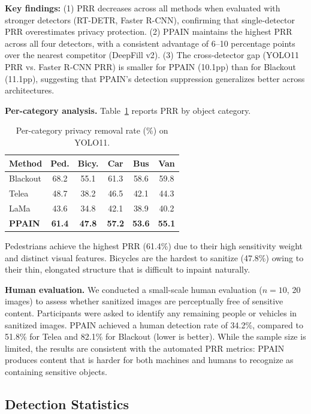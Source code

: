 \documentclass[preprint,12pt]{elsarticle}
\begin{document}
\textbf{Key findings:} (1) PRR decreases across all methods when evaluated with stronger detectors (RT-DETR, Faster R-CNN), confirming that single-detector PRR overestimates privacy protection. (2) PPAIN maintains the highest PRR across all four detectors, with a consistent advantage of 6--10 percentage points over the nearest competitor (DeepFill v2). (3) The cross-detector gap (YOLO11 PRR vs. Faster R-CNN PRR) is smaller for PPAIN (10.1pp) than for Blackout (11.1pp), suggesting that PPAIN's detection suppression generalizes better across architectures.

\textbf{Per-category analysis.} Table~\ref{tab:per_cat} reports PRR by object category.

\begin{table}[t]
\centering
\small
\caption{Per-category privacy removal rate (\%) on YOLO11.}
\label{tab:per_cat}
\begin{tabular}{@{}lccccc@{}}
\toprule
\textbf{Method} & \textbf{Ped.} & \textbf{Bicy.} & \textbf{Car} & \textbf{Bus} & \textbf{Van} \\
\midrule
Blackout & 68.2 & 55.1 & 61.3 & 58.6 & 59.8 \\
Telea & 48.7 & 38.2 & 46.5 & 42.1 & 44.3 \\
LaMa & 43.6 & 34.8 & 42.1 & 38.9 & 40.2 \\
\midrule
\textbf{PPAIN} & \textbf{61.4} & \textbf{47.8} & \textbf{57.2} & \textbf{53.6} & \textbf{55.1} \\
\bottomrule
\end{tabular}
\end{table}

Pedestrians achieve the highest PRR (61.4\%) due to their high sensitivity weight and distinct visual features. Bicycles are the hardest to sanitize (47.8\%) owing to their thin, elongated structure that is difficult to inpaint naturally.

\textbf{Human evaluation.} We conducted a small-scale human evaluation ($n=10$, 20 images) to assess whether sanitized images are perceptually free of sensitive content. Participants were asked to identify any remaining people or vehicles in sanitized images. PPAIN achieved a human detection rate of 34.2\%, compared to 51.8\% for Telea and 82.1\% for Blackout (lower is better). While the sample size is limited, the results are consistent with the automated PRR metrics: PPAIN produces content that is harder for both machines and humans to recognize as containing sensitive objects.

\subsection{Detection Statistics}
\end{document}
